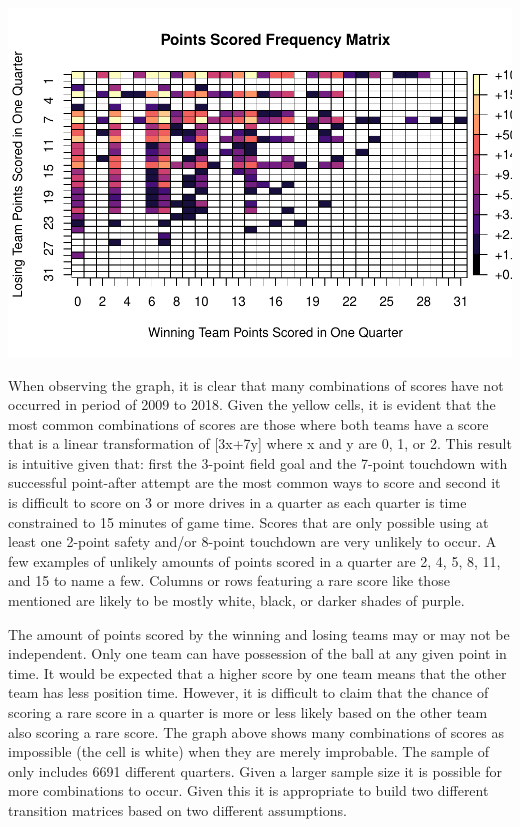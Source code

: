 \documentclass[
]{article}
\begin{document}
\includegraphics{ScorigamiMC_files/figure-latex/Points Scored Frequency Matrix-1.pdf}

When observing the graph, it is clear that many combinations of scores
have not occurred in period of 2009 to 2018. Given the yellow cells, it
is evident that the most common combinations of scores are those where
both teams have a score that is a linear transformation of {[}3x+7y{]}
where x and y are 0, 1, or 2. This result is intuitive given that: first
the 3-point field goal and the 7-point touchdown with successful
point-after attempt are the most common ways to score and second it is
difficult to score on 3 or more drives in a quarter as each quarter is
time constrained to 15 minutes of game time. Scores that are only
possible using at least one 2-point safety and/or 8-point touchdown are
very unlikely to occur. A few examples of unlikely amounts of points
scored in a quarter are 2, 4, 5, 8, 11, and 15 to name a few. Columns or
rows featuring a rare score like those mentioned are likely to be mostly
white, black, or darker shades of purple.

The amount of points scored by the winning and losing teams may or may
not be independent. Only one team can have possession of the ball at any
given point in time. It would be expected that a higher score by one
team means that the other team has less position time. However, it is
difficult to claim that the chance of scoring a rare score in a quarter
is more or less likely based on the other team also scoring a rare
score. The graph above shows many combinations of scores as impossible
(the cell is white) when they are merely improbable. The sample of only
includes 6691 different quarters. Given a larger sample size it is
possible for more combinations to occur. Given this it is appropriate to
build two different transition matrices based on two different
assumptions.
\end{document}
